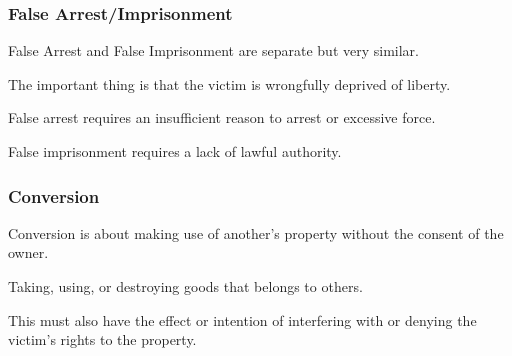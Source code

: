 \begin{frame}
\frametitle{False Arrest/Imprisonment}

False Arrest and False Imprisonment are separate but very similar.

The important thing is that the victim is wrongfully deprived of liberty.

False arrest requires an insufficient reason to arrest or excessive force.

False imprisonment requires a lack of lawful authority.


\end{frame}



\begin{frame}
\frametitle{Conversion}

Conversion is about making use of another's property without the consent of the owner.

Taking, using, or destroying goods that belongs to others.

This must also have the effect or intention of interfering with or denying the victim's rights to the property.


\end{frame}





